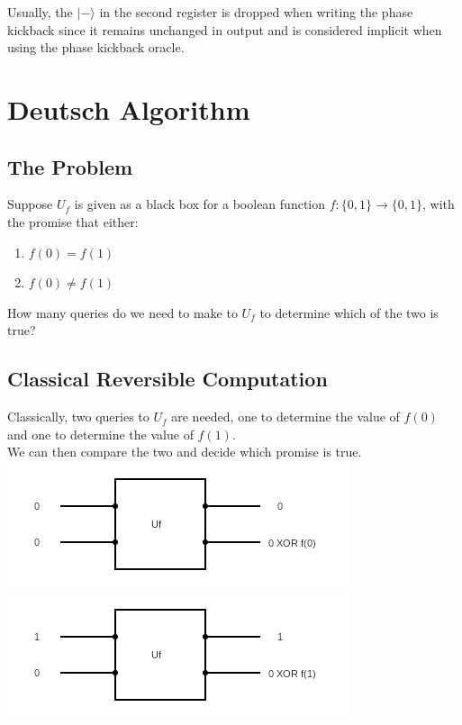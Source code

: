 \documentclass{article}
\begin{document}
    Usually, the $|-\rangle$ in the second register is dropped when writing the phase kickback since it remains unchanged in output and is considered implicit when using the phase kickback oracle.

    \section{Deutsch Algorithm}
    \subsection{The Problem}
    Suppose $U_f$ is given as a black box for a boolean function $f: \{0,1\} \rightarrow \{0,1\}$, with the promise that either:
        \begin{enumerate}[label=(\roman*)]
            \item $f(0)=f(1)$
            \item $f(0) \neq f(1)$
        \end{enumerate}
    How many queries do we need to make to $U_f$ to determine which of the two is true?  
    \subsection{Classical Reversible Computation}
    Classically, two queries to $U_f$ are needed, one to determine the value of $f(0)$ and one to determine the value of $f(1)$. \\
    We can then compare the two and decide which promise is true.
    \\ \includegraphics{images/classicalD0.png}
    \includegraphics{images/classicalD1.png}
\end{document}
